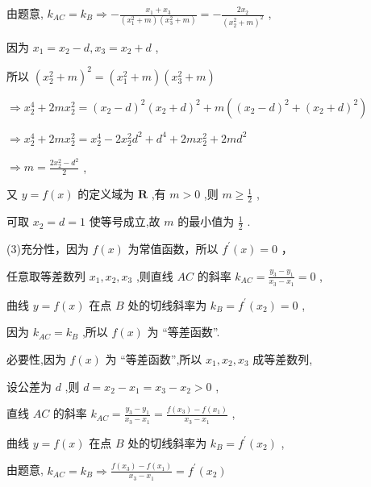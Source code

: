 \documentclass[10pt]{article}
\begin{document}
由题意, \({k}_{AC} = {k}_{B} \Rightarrow   - \frac{{x}_{1} + {x}_{3}}{\left( {{x}_{1}^{2} + m}\right) \left( {{x}_{3}^{2} + m}\right) } =  - \frac{2{x}_{2}}{{\left( {x}_{2}^{2} + m\right) }^{2}}\) ,

因为 \({x}_{1} = {x}_{2} - d,{x}_{3} = {x}_{2} + d\) ,

所以 \({\left( {x}_{2}^{2} + m\right) }^{2} = \left( {{x}_{1}^{2} + m}\right) \left( {{x}_{3}^{2} + m}\right)\)

\(\Rightarrow  {x}_{2}^{4} + {2m}{x}_{2}^{2} = {\left( {x}_{2} - d\right) }^{2}{\left( {x}_{2} + d\right) }^{2} + m\left( {{\left( {x}_{2} - d\right) }^{2} + {\left( {x}_{2} + d\right) }^{2}}\right)\)

\(\Rightarrow  {x}_{2}^{4} + {2m}{x}_{2}^{2} = {x}_{2}^{4} - 2{x}_{2}^{2}{d}^{2} + {d}^{4} + {2m}{x}_{2}^{2} + {2m}{d}^{2}\)

\(\Rightarrow  m = \frac{2{x}_{2}^{2} - {d}^{2}}{2}\) ,

又 \(y = f\left( x\right)\) 的定义域为 \(\mathbf{R}\) ,有 \(m > 0\) ,则 \(m \geq  \frac{1}{2}\) ,

可取 \({x}_{2} = d = 1\) 使等号成立,故 \(m\) 的最小值为 \(\frac{1}{2}\) .

(3)充分性，因为 \(f\left( x\right)\) 为常值函数，所以 \({f}^{\prime }\left( x\right)  = 0\) ，

任意取等差数列 \({x}_{1},{x}_{2},{x}_{3}\) ,则直线 \({AC}\) 的斜率 \({k}_{AC} = \frac{{y}_{3} - {y}_{1}}{{x}_{3} - {x}_{1}} = 0\) ,

曲线 \(y = f\left( x\right)\) 在点 \(B\) 处的切线斜率为 \({k}_{B} = {f}^{\prime }\left( {x}_{2}\right)  = 0\) ,

因为 \({k}_{AC} = {k}_{B}\) ,所以 \(f\left( x\right)\) 为 “等差函数”.

必要性,因为 \(f\left( x\right)\) 为 “等差函数”,所以 \({x}_{1},{x}_{2},{x}_{3}\) 成等差数列,

设公差为 \(d\) ,则 \(d = {x}_{2} - {x}_{1} = {x}_{3} - {x}_{2} > 0\) ,

直线 \({AC}\) 的斜率 \({k}_{AC} = \frac{{y}_{3} - {y}_{1}}{{x}_{3} - {x}_{1}} = \frac{f\left( {x}_{3}\right)  - f\left( {x}_{1}\right) }{{x}_{3} - {x}_{1}}\) ,

曲线 \(y = f\left( x\right)\) 在点 \(B\) 处的切线斜率为 \({k}_{B} = {f}^{\prime }\left( {x}_{2}\right)\) ,

由题意, \({k}_{AC} = {k}_{B} \Rightarrow  \frac{f\left( {x}_{3}\right)  - f\left( {x}_{1}\right) }{{x}_{3} - {x}_{1}} = {f}^{\prime }\left( {x}_{2}\right)\)
\end{document}
